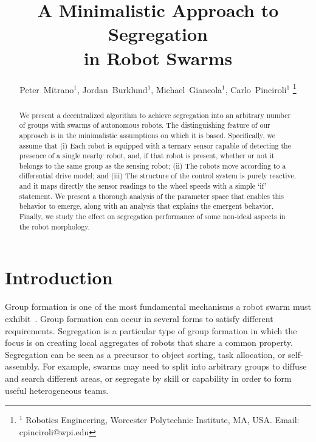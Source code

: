 \documentclass[letterpaper, 10 pt, conference]{ieeeconf}
\begin{document}
\title{\LARGE \bf
A Minimalistic Approach to Segregation\\
in Robot Swarms}

\author{
  Peter~Mitrano$^{1}$,
  Jordan~Burklund$^{1}$,
  Michael~Giancola$^{1}$,
  Carlo~Pinciroli$^{1}$%
  \thanks{$^{1}$ Robotics Engineering, Worcester Polytechnic Institute, MA, USA. Email: {\sf cpinciroli@wpi.edu}}%
}

\maketitle
\thispagestyle{empty}
\pagestyle{empty}

\begin{abstract}
  We present a decentralized algorithm to achieve segregation into an arbitrary
  number of groups with swarms of autonomous robots. The distinguishing feature
  of our approach is in the minimalistic assumptions on which it is
  based. Specifically, we assume that (i) Each robot is equipped with a ternary
  sensor capable of detecting the presence of a single nearby robot, and, if
  that robot is present, whether or not it belongs to the same group as the
  sensing robot; (ii) The robots move according to a differential drive model;
  and (iii) The structure of the control system is purely reactive, and it maps
  directly the sensor readings to the wheel speeds with a simple `if' statement.
  We present a thorough analysis of the parameter space that enables this
  behavior to emerge, along with an analysis that explains the emergent
  behavior. Finally, we study the effect on segregation performance of some
  non-ideal aspects in the robot morphology.
\end{abstract}

\section{Introduction}

Group formation is one of the most fundamental mechanisms a robot swarm must
exhibit~\cite{Brambilla2013}. Group formation can occur in several forms to
satisfy different requirements. Segregation is a particular type of group
formation in which the focus is on creating local aggregates of robots that
share a common property. Segregation can be seen as a precursor to object
sorting, task allocation, or self-assembly. For example, swarms may need to
split into arbitrary groups to diffuse and search different areas, or segregate
by skill or capability in order to form useful heterogeneous teams.
\end{document}
